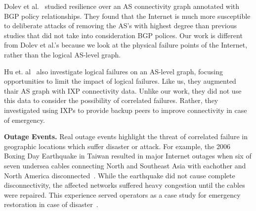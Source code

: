     Dolev et al.~\cite{resilience-under-BGP} studied resilience over an AS
    connectivity graph annotated with BGP policy relationships. They found that
    the Internet is much more susceptible to deliberate attacks of removing the
    AS's with highest degree than previous studies that did not take into
    consideration BGP polices. Our work is different from Dolev et al.'s because
    we look at the physical failure points of the Internet, rather than the
    logical AS-level graph.  
    
    Hu et. al~\cite{ixp-routingdiversity} also investigate logical failures on
    an AS-level graph, focusing opportunities to limit the impact of logical
    failures.
    Like us, they augmented thair AS graph with IXP connectivity data.  Unlike
    our work, they did not use this data to consider the possibility of
    correlated failures.  Rather, they investigated using IXPs to provide
    backup peers to improve connectivity in case of emergency.

{\bf Outage Events.}  Real outage events highlight the threat of correlated
    failure in geographic locations which suffer disaster or attack.  For
    example, the 2006 Boxing Day Earthquake in Taiwan resulted in major Internet
    outages when six of seven undersea cables connecting North and Southeast
    Asia with eachother and North America disconnected~\cite{asia-comm-quake}.
    While the earthquake did not cause complete disconnectivity, the affected
    networks suffered heavy congestion until the cables were repaired.  This
    experience served operators as a case study for emergency restoration in
    case of disaster~\cite{taiwan}.  
       


